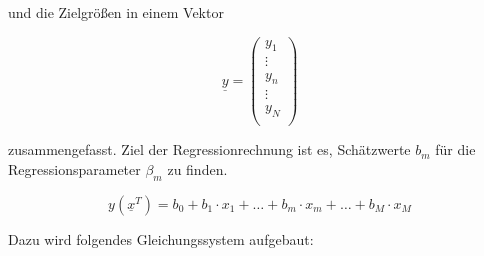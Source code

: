 \noindent und die Zielgr\"{o}{\ss}en in einem Vektor 

\begin{equation}\label{eq:thirteenthree}
\underline{y}=
\begin{pmatrix}
y_{1}\\
\vdots\\
y_{n}\\
\vdots\\
y_{N}\\
\end{pmatrix}
\end{equation}

\noindent zusammengefasst. Ziel der Regressionrechnung ist es, Sch\"{a}tzwerte $b_{m}$ f\"{u}r die Regressionsparameter $\beta_{m}$ zu finden. 

\begin{equation}\label{eq:thirteenfour}
y\left(\underline{x}^{T} \right)=b_{0} +b_{1} \cdot x_{1} +\ldots +b_{m} \cdot x_{m} +\ldots +b_{M} \cdot x_{M}
\end{equation}

\noindent Dazu wird folgendes Gleichungssystem aufgebaut:

